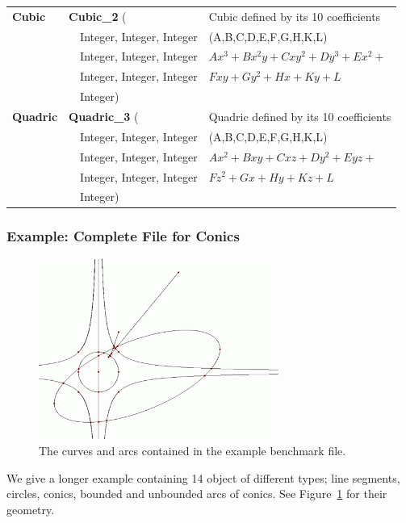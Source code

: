 \begin{tabular}{*{3}{| l} |}
{\bf Cubic} & {\bf Cubic\_2} (        & Cubic defined by its 10 coefficients \\
      & \ \ Integer, Integer, Integer & (A,B,C,D,E,F,G,H,K,L)\\
      & \ \ Integer, Integer, Integer & \begin{math} Ax^3+Bx^2y+Cxy^2+Dy^3+Ex^2+ \end{math}\\
      & \ \ Integer, Integer, Integer & \begin{math}Fxy+Gy^2+Hx+Ky+L\end{math}\\
      & \ \ Integer)                  & \\ \hline

{\bf Quadric} & {\bf Quadric\_3} (      & Quadric defined by its 10 coefficients \\
        & \ \ Integer, Integer, Integer & (A,B,C,D,E,F,G,H,K,L)\\
        & \ \ Integer, Integer, Integer & \begin{math} Ax^2+Bxy+Cxz+Dy^2+Eyz+ \end{math}\\
        & \ \ Integer, Integer, Integer & \begin{math}Fz^2+Gx+Hy+Kz+L\end{math}\\
        & \ \ Integer)                  & \\ \hline

\end{tabular}

\subsubsection {Example: Complete File for Conics}
\label{longexample}

\begin{figure}
  \centerline{\includegraphics[width=0.7\textwidth]{fig/Conics_14_1}}

  \caption{The curves and arcs contained in the example benchmark
    file.\label{fig:example}}
\end{figure}

We give a longer example containing 14 object of different types; line
segments, circles, conics, bounded and unbounded arcs of conics. See
Figure~\ref{fig:example} for their geometry.

